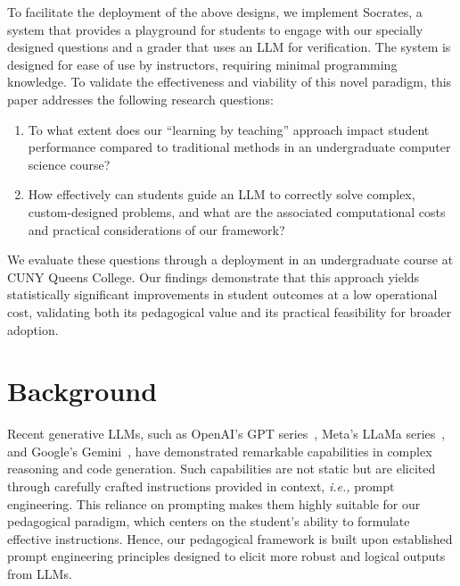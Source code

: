 \documentclass{article} %
\begin{document}
To facilitate the deployment of the above designs, we implement \textsf{Socrates}, a system that provides a playground for students to engage with our specially designed questions and a grader that uses an LLM for verification. The system is designed for ease of use by instructors, requiring minimal programming knowledge. To validate the effectiveness and viability of this novel paradigm, this paper addresses the following research questions:
\begin{enumerate}[itemsep=0.1em, topsep=0.1em, leftmargin=1.25em]
    \item To what extent does our ``learning by teaching'' approach impact student performance compared to traditional methods in an undergraduate computer science course?
    \item How effectively can students guide an LLM to correctly solve complex, custom-designed problems, and what are the associated computational costs and practical considerations of our framework?
\end{enumerate}
We evaluate these questions through a deployment in an undergraduate course at CUNY Queens College. Our findings demonstrate that this approach yields statistically significant improvements in student outcomes at a low operational cost, validating both its pedagogical value and its practical feasibility for broader adoption.


\section{Background}





Recent generative LLMs, such as OpenAI's GPT series~\citep{kalyan2023survey,achiam2023gpt}, Meta's LLaMa series~\citep{touvron2023llama, touvron2023llama2, meta2024llama3}, and Google's Gemini~\citep{team2023gemini}, have demonstrated remarkable capabilities in complex reasoning and code generation. Such capabilities are not static but are elicited through carefully crafted instructions provided in context, {\em i.e.,} prompt engineering. This reliance on prompting makes them highly suitable for our pedagogical paradigm, which centers on the student's ability to formulate effective instructions.
Hence, our pedagogical framework is built upon established prompt engineering principles designed to elicit more robust and logical outputs from LLMs.
\end{document}
